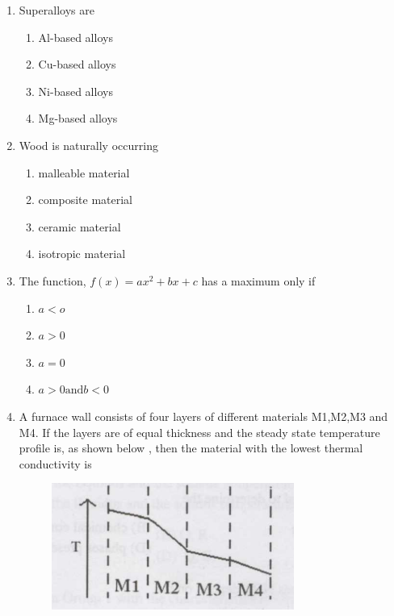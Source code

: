 \documentclass[journal]{IEEEtran}
\theoremstyle{remark}
\begin{document}
\begin{enumerate}
\item Superalloys are \hfill{}
\begin{multicols}{2}
\begin{enumerate}
\item Al-based alloys
\item Cu-based alloys
\item Ni-based alloys
\item Mg-based alloys
\end{enumerate}
\end{multicols}

\item Wood is naturally occurring 
\hfill{}
\begin{multicols}{2}
\begin{enumerate}
\item malleable material
\item composite material
\item ceramic material
\item isotropic material    
\end{enumerate}
\end{multicols}
\item The function, $f(x)=ax^2+bx+c$ has a maximum only if \hfill{}
\begin{multicols}{4}
\begin{enumerate}
        \item$a<o$
        \item $a>0$
        \item $a=0$
        \item $a>0\text{and}b<0$
\end{enumerate}
\end{multicols}
\item A furnace wall consists of four layers of different materials M1,M2,M3 and M4. If the layers are of equal thickness and the steady state temperature profile is, as shown below , then the material with the lowest thermal conductivity is\hfill{}
\begin{figure}[h]
    \centering
    \includegraphics[width=0.5\linewidth]{figs/Q.12.png}

\end{figure}
\end{enumerate}
\end{document}
